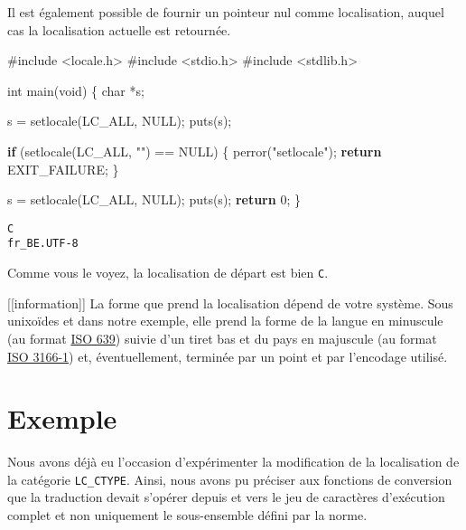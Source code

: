 \documentclass[]{article}
\newenvironment{Shaded}{}{}
\newcommand{\DataTypeTok}[1]{\textcolor[rgb]{0.56,0.13,0.00}{{#1}}}
\newcommand{\DecValTok}[1]{\textcolor[rgb]{0.25,0.63,0.44}{{#1}}}
\newcommand{\StringTok}[1]{\textcolor[rgb]{0.25,0.44,0.63}{{#1}}}
\newcommand{\ImportTok}[1]{{#1}}
\newcommand{\ControlFlowTok}[1]{\textcolor[rgb]{0.00,0.44,0.13}{\textbf{{#1}}}}
\newcommand{\PreprocessorTok}[1]{\textcolor[rgb]{0.74,0.48,0.00}{{#1}}}
\newcommand{\NormalTok}[1]{{#1}}
\begin{document}
Il est également possible de fournir un pointeur nul comme localisation,
auquel cas la localisation actuelle est retournée.

\begin{Shaded}
\begin{Highlighting}[]
\PreprocessorTok{#include }\ImportTok{<locale.h>}
\PreprocessorTok{#include }\ImportTok{<stdio.h>}
\PreprocessorTok{#include }\ImportTok{<stdlib.h>}


\DataTypeTok{int} \NormalTok{main(}\DataTypeTok{void}\NormalTok{)}
\NormalTok{\{}
    \DataTypeTok{char} \NormalTok{*s;}

    \NormalTok{s = setlocale(LC_ALL, NULL);}
    \NormalTok{puts(s);}

    \ControlFlowTok{if} \NormalTok{(setlocale(LC_ALL, }\StringTok{""}\NormalTok{) == NULL)}
    \NormalTok{\{}
        \NormalTok{perror(}\StringTok{"setlocale"}\NormalTok{);}
        \ControlFlowTok{return} \NormalTok{EXIT_FAILURE;}
    \NormalTok{\}}

    \NormalTok{s = setlocale(LC_ALL, NULL);}
    \NormalTok{puts(s);}
    \ControlFlowTok{return} \DecValTok{0}\NormalTok{;}
\NormalTok{\}}
\end{Highlighting}
\end{Shaded}

\begin{verbatim}
C
fr_BE.UTF-8
\end{verbatim}

Comme vous le voyez, la localisation de départ est bien \texttt{C}.

{[}{[}information{]}{]} \textbar{} La forme que prend la localisation
dépend de votre système. Sous unixoïdes et dans notre exemple, elle
prend la forme de la langue en minuscule (au format
\href{https://fr.wikipedia.org/wiki/ISO_639}{ISO 639}) suivie d'un tiret
bas et du pays en majuscule (au format
\href{https://fr.wikipedia.org/wiki/ISO_3166}{ISO 3166-1}) et,
éventuellement, terminée par un point et par l'encodage utilisé.

\section{Exemple}\label{exemple}

Nous avons déjà eu l'occasion d'expérimenter la modification de la
localisation de la catégorie \texttt{LC\_CTYPE}. Ainsi, nous avons pu
préciser aux fonctions de conversion que la traduction devait s'opérer
depuis et vers le jeu de caractères d'exécution complet et non
uniquement le sous-ensemble défini par la norme.
\end{document}
